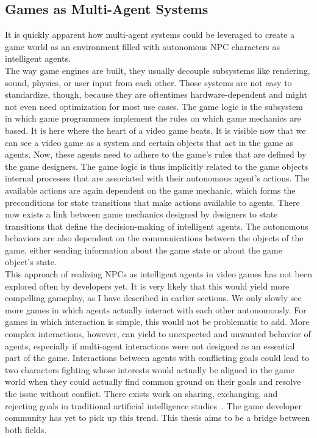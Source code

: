 \subsection{Games as Multi-Agent Systems}
It is quickly apparent how multi-agent systems could be leveraged to create a game world as an environment filled with autonomous NPC characters as intelligent agents.\\
The way game engines are built, they usually decouple subsystems like rendering, sound, physics, or user input from each other. Those systems are not easy to standardize, though, because they are oftentimes hardware-dependent and might not even need optimization for most use cases. The game logic is the subsystem in which game programmers implement the rules on which game mechanics are based. It is here where the heart of a video game beats. It is visible now that we can see a video game as a system and certain objects that act in the game as agents. Now, these agents need to adhere to the game’s rules that are defined by the game designers. The game logic is thus implicitly related to the game objects internal processes that are associated with their autonomous agent’s actions. The available actions are again dependent on the game mechanic, which forms the preconditions for state transitions that make actions available to agents. There now exists a link between game mechanics designed by designers to state transitions that define the decision-making of intelligent agents. The autonomous behaviors are also dependent on the communications between the objects of the game, either sending information about the game state or about the game object’s state.~\cite{MarinLora2020}\\
This approach of realizing NPCs as intelligent agents in video games has not been explored often by developers yet. It is very likely that this would yield more compelling gameplay, as I have described in earlier sections. We only slowly see more games in which agents actually interact with each other autonomously. For games in which interaction is simple, this would not be problematic to add. More complex interactions, however, can yield to unexpected and unwanted behavior of agents, especially if multi-agent interactions were not designed as an essential part of the game. Interactions between agents with conflicting goals could lead to two characters fighting whose interests would actually be aligned in the game world when they could actually find common ground on their goals and resolve the issue without conflict. There exists work on sharing, exchanging, and rejecting goals in traditional artificial intelligence studies~\cite{Kraus1997}. The game developer community has yet to pick up this trend. This thesis aims to be a bridge between both fields.~\cite{Dignum2009}\\
